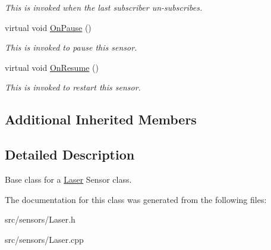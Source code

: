 \begin{DoxyCompactItemize}
\begin{DoxyCompactList}\small\item\em This is invoked when the last subscriber un-\/subscribes. \end{DoxyCompactList}\item 
\mbox{\label{class_laser_a167caa7397e04b6e4046a8978d6e435e}} 
virtual void \hyperlink{class_laser_a167caa7397e04b6e4046a8978d6e435e}{On\+Pause} ()
\begin{DoxyCompactList}\small\item\em This is invoked to pause this sensor. \end{DoxyCompactList}\item 
\mbox{\label{class_laser_a5cc939b5cab69c8861351f41b8a9f4fc}} 
virtual void \hyperlink{class_laser_a5cc939b5cab69c8861351f41b8a9f4fc}{On\+Resume} ()
\begin{DoxyCompactList}\small\item\em This is invoked to restart this sensor. \end{DoxyCompactList}\end{DoxyCompactItemize}
\subsection*{Additional Inherited Members}


\subsection{Detailed Description}
Base class for a \hyperlink{class_laser}{Laser} Sensor class. 

The documentation for this class was generated from the following files\+:\begin{DoxyCompactItemize}
\item 
src/sensors/Laser.\+h\item 
src/sensors/Laser.\+cpp\end{DoxyCompactItemize}
